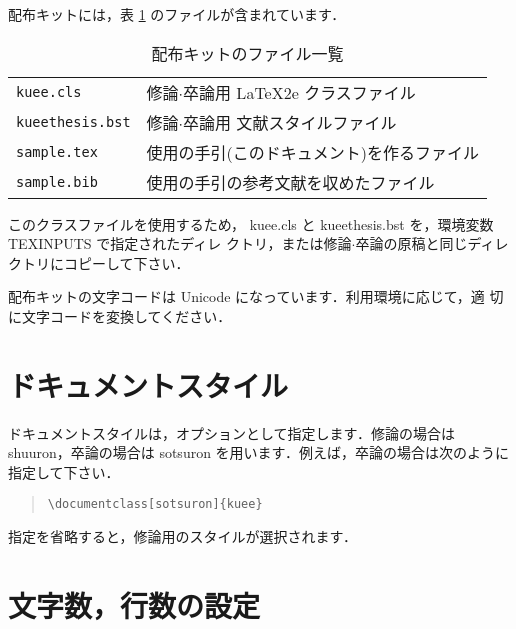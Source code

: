 \documentclass[
  sotsuron]{kuee}
\begin{document}
配布キットには，表 \ref{tab:kit} のファイルが含まれています．

\begin{table}
  \caption{配布キットのファイル一覧}\label{tab:kit}
  \begin{center}
    \begin{tabular}{ll}
      \verb+kuee.cls+ & 修論$\cdot$卒論用 \LaTeX2e{} クラスファイル       \\
      \verb+kueethesis.bst+ & 修論$\cdot$卒論用 文献スタイルファイル \\
      \verb+sample.tex+ & 使用の手引(このドキュメント)を作るファイル        \\
      \verb+sample.bib+ & 使用の手引の参考文献を収めたファイル              \\
    \end{tabular}
  \end{center}
\end{table}

このクラスファイルを使用するため， kuee.cls と kueethesis.bst
を，環境変数 TEXINPUTS で指定されたディレ
クトリ，または修論\(\cdot\)卒論の原稿と同じディレクトリにコピーして下さい．

配布キットの文字コードは Unicode になっています．利用環境に応じて，適
切に文字コードを変換してください．

\hypertarget{ux30c9ux30adux30e5ux30e1ux30f3ux30c8ux30b9ux30bfux30a4ux30eb}{%
\section{ドキュメントスタイル}\label{ux30c9ux30adux30e5ux30e1ux30f3ux30c8ux30b9ux30bfux30a4ux30eb}}

ドキュメントスタイルは，オプションとして指定します．修論の場合は
shuuron，卒論の場合は sotsuron
を用います．例えば，卒論の場合は次のように指定して下さい．

\begin{quote}
  \begin{verbatim}
\documentclass[sotsuron]{kuee}
\end{verbatim}
\end{quote}

指定を省略すると，修論用のスタイルが選択されます．

\hypertarget{ux6587ux5b57ux6570ux884cux6570ux306eux8a2dux5b9a}{%
\section{文字数，行数の設定}\label{ux6587ux5b57ux6570ux884cux6570ux306eux8a2dux5b9a}}
\end{document}
